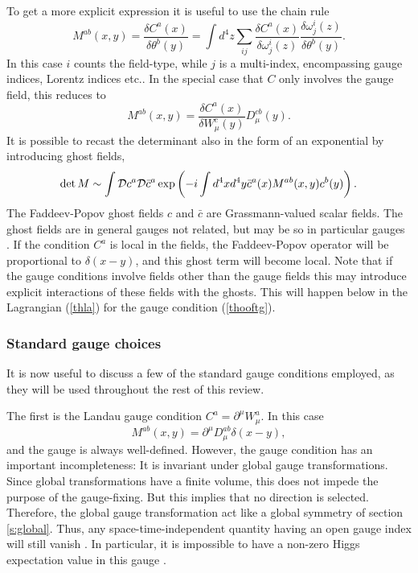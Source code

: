 \documentclass[final,12pt,3p,longtitle]{elsarticle}
\newcommand*{\no}{\noindent}
\newcommand*{\be}{\begin{equation}}
\newcommand*{\ee}{\end{equation}}
\newcommand*{\pd}{\partial}
\newcommand*{\pref}[1]{(\ref{#1})}
\newcommand*{\nn}{\nonumber}
\newcommand*{\1}{1\!\!\!\bot}
\begin{document}
To get a more explicit expression it is useful to use the chain rule
\be
M^{ab}(x,y)=\frac{\delta C^a(x)}{\delta\theta^b(y)}=\int d^4z\sum_{ij}\frac{\delta C^a(x)}{\delta \omega^i_j(z)}\frac{\delta \omega^i_j(z)}{\delta\theta^b(y)}\label{fpsumfield}.
\ee
In this case $i$ counts the field-type, while $j$ is a multi-index, encompassing gauge indices, Lorentz indices etc.. In the special case that $C$ only involves the gauge field, this reduces to
\be
M^{ab}(x,y)=\frac{\delta C^a(x)}{\delta W_\mu^c(y)}D_\mu^{cb}(y).
\ee
\no It is possible to recast the determinant also in the form of an exponential by introducing ghost fields,
\be
\det M\sim\int{\cal D}c^a{\cal D}{\bar c}^a\exp\left(-i\int d^4x d^4y \bar{c}^a(x) M^{ab}(x,y)c^b(y)\right)\nn.
\ee
\no The Faddeev-Popov ghost fields $c$ and $\bar c$ are Grassmann-valued scalar fields. The ghost fields are in general gauges not related, but may be so in particular gauges \cite{Alkofer:2000wg}. If the condition $C^a$ is local in the fields, the Faddeev-Popov operator will be proportional to $\delta(x-y)$, and this ghost term will become local. Note that if the gauge conditions involve fields other than the gauge fields this may introduce explicit interactions of these fields with the ghosts. This will happen below in the Lagrangian \pref{thla} for the gauge condition \pref{thooftg}.

\subsubsection{Standard gauge choices}

It is now useful to discuss a few of the standard gauge conditions employed, as they will be used throughout the rest of this review.

The first is the Landau gauge condition $C^a=\pd^\mu W^a_\mu$. In this case
\be
M^{ab}(x,y)=\pd^\mu D_\mu^{ab}\delta(x-y)\nn,
\ee
\no and the gauge is always well-defined. However, the gauge condition has an important incompleteness: It is invariant under global gauge transformations. Since global transformations have a finite volume, this does not impede the purpose of the gauge-fixing. But this implies that no direction is selected. Therefore, the global gauge transformation act like a global symmetry of section \ref{s:global}. Thus, any space-time-independent quantity having an open gauge index will still vanish \cite{Maas:2012ct}. In particular, it is impossible to have a non-zero Higgs expectation value in this gauge \cite{Maas:2012ct,Frohlich:1980gj,Lee:1974zg}.
\end{document}
